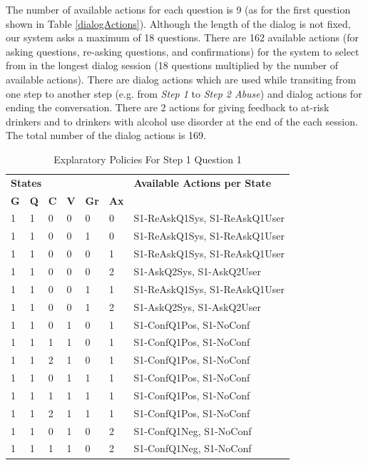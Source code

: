 \begin{sloppy}
The number of available actions for each question is 9 (as for the first question shown in Table \ref{dialogActions}). Although the length of the dialog is not fixed, our system asks a maximum of 18 questions. There are 162 available actions (for asking questions, re-asking questions, and confirmations) for the system to select from in the  longest dialog session (18 questions multiplied by the number of available actions). There are dialog actions which are used while transiting from one step to another step (e.g. from {\em Step 1} to {\em Step 2 Abuse}) and dialog actions for ending the conversation.  There are 2 actions for giving feedback to at-risk drinkers and to drinkers with alcohol use disorder at the end of the each session. The total number of the dialog actions is 169.

\begin{table} 
\caption{Explaratory Policies For Step 1 Question 1}
\label{PolicyTable}
\begin{tabular}{ | l l l l l l | p{49mm}| } \hline
    \multicolumn{6}{|l|}{\bf States} & {\bf Available Actions per State} \\
    \textbf{G} & \textbf{Q} & \textbf{C} & \textbf{V} & \textbf{Gr} & \textbf{Ax} & \\
    \hline
   1 & 1 & 0 & 0 & 0 & 0 & S1-ReAskQ1Sys, S1-ReAskQ1User \\
   1 & 1 & 0 & 0 & 1 & 0 & S1-ReAskQ1Sys, S1-ReAskQ1User \\
   1 & 1 & 0 & 0 & 0 & 1 & S1-ReAskQ1Sys, S1-ReAskQ1User \\
   1 & 1 & 0 & 0 & 0 & 2 & S1-AskQ2Sys, S1-AskQ2User \\
   1 & 1 & 0 & 0 & 1 & 1 & S1-ReAskQ1Sys, S1-ReAskQ1User \\
   1 & 1 & 0 & 0 & 1 & 2 & S1-AskQ2Sys, S1-AskQ2User \\
   1 & 1 & 0 & 1 & 0 & 1 & S1-ConfQ1Pos, S1-NoConf \\
   1 & 1 & 1 & 1 & 0 & 1 & S1-ConfQ1Pos, S1-NoConf \\
   1 & 1 & 2 & 1 & 0 & 1 & S1-ConfQ1Pos, S1-NoConf \\
   1 & 1 & 0 & 1 & 1 & 1 & S1-ConfQ1Pos, S1-NoConf \\
   1 & 1 & 1 & 1 & 1 & 1 & S1-ConfQ1Pos, S1-NoConf \\
   1 & 1 & 2 & 1 & 1 & 1 & S1-ConfQ1Pos, S1-NoConf \\
   1 & 1 & 0 & 1 & 0 & 2 & S1-ConfQ1Neg, S1-NoConf \\
   1 & 1 & 1 & 1 & 0 & 2 & S1-ConfQ1Neg, S1-NoConf \\

\end{tabular}
\end{table}
\end{sloppy}
